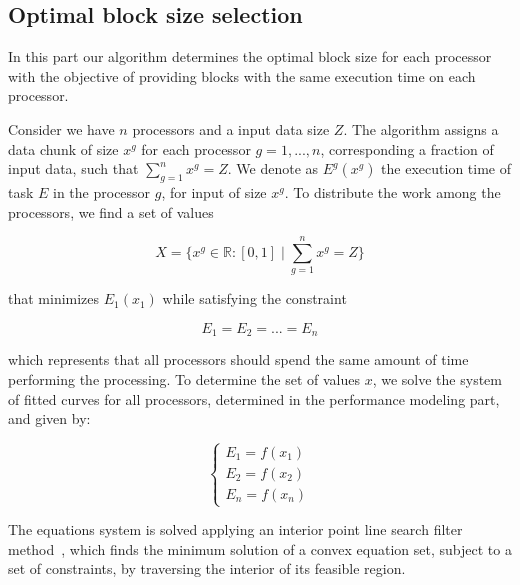 \documentclass[journal]{IEEEtran}
\begin{document}
\vspace{0.2cm}
\subsection{Optimal block size selection}
In this part our algorithm determines 
the optimal block size for each processor with the objective of providing blocks
with the same execution time on each processor.

Consider we have $n$ processors and a input data size $Z$. The algorithm assigns
a data chunk of size $x^g$ for each processor $g=1,...,n$, corresponding a
fraction of input data, such that $\sum_{g=1}^n x^g = Z$. We denote as
$E^g(x^g)$ the execution time of task $E$ in the processor $g$, for input of
size $x^g$. To distribute the work among the processors, we find a set of values
	
\begin{equation}
	X = \{ x^g \in \mathbb{R}:[0,1] \mid \sum_{g=1}^n x^g = Z \}
	\label{eq: totalResultado}
\end{equation}

that minimizes $E_1(x_1)$ while satisfying the constraint

\begin{equation}
	E_{1} = E_{2} = ...= E_{n}
	\label{eq: Restricao}
\end{equation}

which represents that all processors should spend the same amount of time
performing the processing. To determine the set of values $x$, we solve the
system of fitted curves for all processors, determined in the performance
modeling part, and given by:

\begin{equation}
	\left\lbrace
	\begin{array}{ll}
		\displaystyle E_{1} = f(x_{1})  \\
		\displaystyle E_{2} = f(x_{2})   \\
		\displaystyle E_{n} = f(x_{n}) 
		\label{eq: system}
	\end{array}
	\right.
\end{equation}

The equations system is solved applying an interior point line search filter
method~\cite{point}, which finds the minimum solution of a convex equation set,
subject to a set of constraints, by traversing the interior of its
feasible region.
\end{document}
